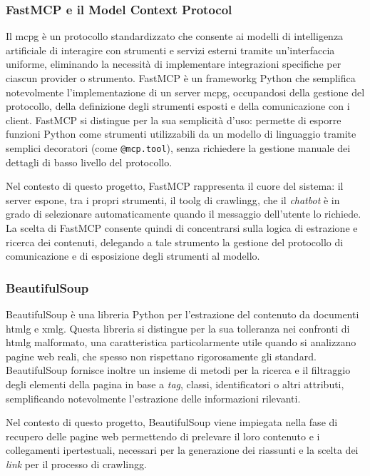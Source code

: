 \subsubsection{FastMCP e il Model Context Protocol}

Il \gls{mcpg} è un protocollo standardizzato che consente ai modelli di intelligenza artificiale di interagire 
con strumenti e servizi esterni tramite un'interfaccia uniforme, eliminando la necessità di implementare 
integrazioni specifiche per ciascun provider o strumento. 
FastMCP è un \gls{frameworkg} Python che semplifica notevolmente l'implementazione di un server 
\gls{mcpg}, occupandosi della gestione del protocollo, della definizione degli strumenti esposti e della comunicazione con i client.
FastMCP si distingue per la sua semplicità d'uso: permette di esporre funzioni Python come strumenti 
utilizzabili da un modello di linguaggio tramite semplici decoratori (come \texttt{@mcp.tool}), senza richiedere la gestione 
manuale dei dettagli di basso livello del protocollo.

Nel contesto di questo progetto, FastMCP rappresenta il cuore del sistema: il server espone, 
tra i propri strumenti, il \gls{toolg} di \gls{crawlingg}, che il \textit{chatbot} è in grado di selezionare 
automaticamente quando il messaggio dell'utente lo richiede. 
La scelta di FastMCP consente quindi di concentrarsi sulla logica di estrazione e ricerca dei contenuti, 
delegando a tale strumento la gestione del protocollo di comunicazione e di esposizione degli strumenti al modello.

\subsubsection{BeautifulSoup}
BeautifulSoup è una libreria Python per l'estrazione del contenuto da documenti \gls{htmlg} e \gls{xmlg}\glsfirstoccur .
Questa libreria si distingue per la sua tolleranza nei confronti di \gls{htmlg} malformato, una caratteristica particolarmente 
utile quando si analizzano pagine web reali, che spesso non rispettano rigorosamente gli standard. 
BeautifulSoup fornisce inoltre un insieme di metodi per la ricerca e il filtraggio degli elementi della pagina in base 
a \textit{tag}, classi, identificatori o altri attributi, semplificando notevolmente l'estrazione delle informazioni rilevanti.

Nel contesto di questo progetto, BeautifulSoup viene impiegata nella fase di recupero delle pagine web permettendo di
prelevare il loro contenuto e i collegamenti ipertestuali, 
necessari per la generazione dei riassunti e la scelta 
dei \textit{link} per il processo di \gls{crawlingg}.

